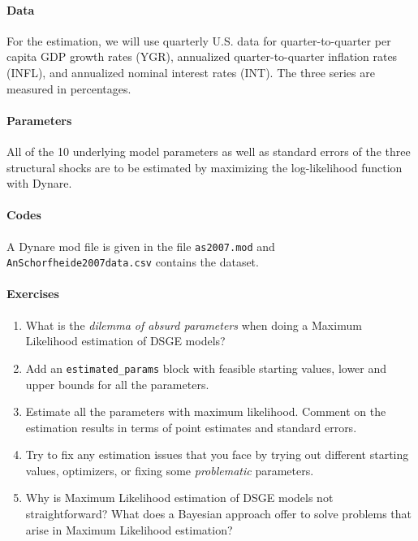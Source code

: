 \documentclass{article}
\begin{document}
\paragraph{Data}
For the estimation, we will use quarterly U.S. data for quarter-to-quarter per capita GDP growth rates (YGR),
annualized quarter-to-quarter inflation rates (INFL), and annualized nominal interest rates (INT).
The three series are measured in percentages.

\paragraph{Parameters}
All of the 10 underlying model parameters as well as standard errors of the three structural shocks are to be estimated by maximizing the log-likelihood function with Dynare.

\paragraph{Codes}
A Dynare mod file is given in the file \texttt{as2007.mod}
  and \texttt{AnSchorfheide2007data.csv} contains the dataset.

\paragraph{Exercises}

\begin{enumerate}
\item What is the \emph{dilemma of absurd parameters} when doing a Maximum Likelihood estimation of DSGE models?

\item Add an \texttt{estimated\_params} block with feasible starting values, lower and upper bounds for all the parameters.

\item Estimate all the parameters with maximum likelihood.
Comment on the estimation results in terms of point estimates and standard errors.

\item Try to fix any estimation issues that you face
  by trying out different starting values, optimizers, or fixing some \emph{problematic} parameters.

\item Why is Maximum Likelihood estimation of DSGE models not straightforward?
What does a Bayesian approach offer to solve problems that arise in Maximum Likelihood estimation?

\end{enumerate}
\end{document}
